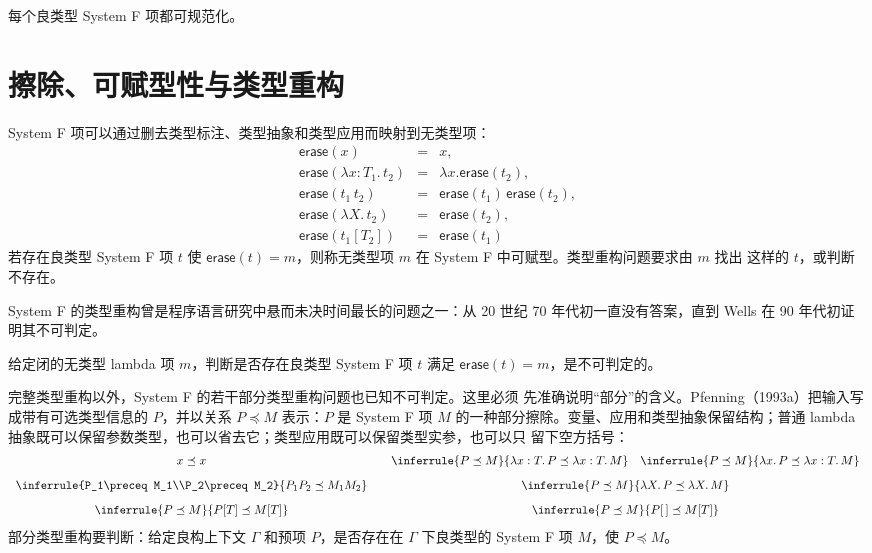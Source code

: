 \begin{theorem}[规范化]
\label{thm:23.5.3}
每个良类型 System F 项都可规范化。
\end{theorem}

\section{擦除、可赋型性与类型重构}
\label{sec:23.6}

System F 项可以通过删去类型标注、类型抽象和类型应用而映射到无类型项：
\[
\begin{array}{rcl}
\mathsf{erase}(x)&=&x,\\
\mathsf{erase}(\lambda x:T_1.\,t_2)&=&\lambda x.\mathsf{erase}(t_2),\\
\mathsf{erase}(t_1\,t_2)&=&\mathsf{erase}(t_1)\,\mathsf{erase}(t_2),\\
\mathsf{erase}(\lambda X.\,t_2)&=&\mathsf{erase}(t_2),\\
\mathsf{erase}(t_1[T_2])&=&\mathsf{erase}(t_1)
\end{array}
\]
若存在良类型 System F 项 \(t\) 使 \(\mathsf{erase}(t)=m\)，则称无类型项 \(m\)
在 System F 中可赋型。类型重构问题要求由 \(m\) 找出
这样的 \(t\)，或判断不存在。

System F 的类型重构曾是程序语言研究中悬而未决时间最长的问题之一：从
20 世纪 70 年代初一直没有答案，直到 Wells 在 90 年代初证明其不可判定。

\begin{theorem}[Wells，1994]
\label{thm:23.6.1}
给定闭的无类型 lambda 项 \(m\)，判断是否存在良类型 System F 项 \(t\)
满足 \(\mathsf{erase}(t)=m\)，是不可判定的。
\end{theorem}

完整类型重构以外，System F 的若干部分类型重构问题也已知不可判定。这里必须
先准确说明“部分”的含义。Pfenning（1993a）把输入写成带有可选类型信息的
 \(P\)，并以关系 \(P\preceq M\) 表示：\(P\) 是
System F 项 \(M\) 的一种部分擦除。变量、应用和类型抽象保留结构；普通 lambda
抽象既可以保留参数类型，也可以省去它；类型应用既可以保留类型实参，也可以只
留下空方括号：
\[
\begin{array}{c@{\qquad}c}
x\preceq x
&
\inferrule{P\preceq M}{\lambda x:T.\,P\preceq\lambda x:T.\,M}
\quad
\inferrule{P\preceq M}{\lambda x.\,P\preceq\lambda x:T.\,M}
\\[3mm]
\inferrule{P_1\preceq M_1\\P_2\preceq M_2}{P_1P_2\preceq M_1M_2}
&
\inferrule{P\preceq M}{\lambda X.\,P\preceq\lambda X.\,M}
\\[3mm]
\inferrule{P\preceq M}{P[T]\preceq M[T]}
&
\inferrule{P\preceq M}{P[\,]\preceq M[T]}
\end{array}
\]
部分类型重构要判断：给定良构上下文 \(\Gamma\) 和预项 \(P\)，是否存在在
\(\Gamma\) 下良类型的 System F 项 \(M\)，使 \(P\preceq M\)。

